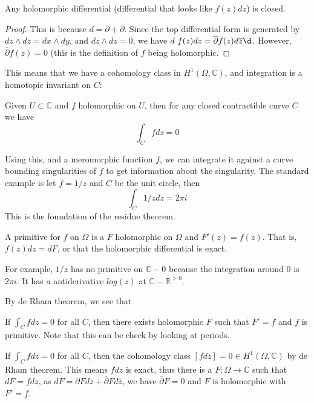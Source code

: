 \documentclass[main.tex]{subfiles}
\begin{document}
\begin{lemma}
Any holomorphic differential (differential that looks like $f(z) dz$) is closed. 
\end{lemma}

\begin{proof}
This is because $d = \partial + \overline{\partial}$. Since the top differential form is generated by $dz \wedge d\overline{z} = dx \wedge dy$, and $dz \wedge dz = 0$, we have $d \ f(z) dz = \overline{\partial} f(z) d\overline{z} \d$. However, $\overline{\partial} f(z) = 0$ (this is the definition of $f$ being holomorphic. 
\end{proof}

This means that we have a cohomology class in $H^1(\Omega, \mathbb{C})$, and integration is a homotopic invariant on $C$:

\begin{corollary}
Given $U \subset \mathbb{C}$ and $f$ holomorphic on $U$, then for any closed contractible curve $C$ we have 
$$
\int_C f dz = 0
$$
\end{corollary}

Using this, and a meromorphic function $f$, we can integrate it against a curve bounding singularities of $f$ to get information about the singularity. The standard example is let $f = 1/z$ and $C$ be the unit circle, then 
$$
\int_C 1/z dz = 2\pi i
$$
This is the foundation of the residue theorem. 

\begin{definition}

A primitive for $f$ on $\Omega$ is a $F$ holomorphic on $\Omega$ and $F'(z) = f(z)$. 
That is, $f(z) dz = dF$, or that the holomorphic differential is exact. 
\end{definition}

For example, $1/z$ has no primitive on $\mathbb{C}-0$ because the integration around $0$ is $2\pi i$. It has a antiderivative $log(z)$ at $\mathbb{C} - \mathbb{R}^{>0}$.



By de Rham theorem, we see that 
\begin{theorem}
If $\int_C f dz = 0$ for all $C$, then there exists holomorphic $F$ such that $F' = f$ and $f$ is primitive. Note that this can be check by looking at periods.
\end{theorem}

\begin{theorem}
If $\int_C f dz = 0$ for all $C$, then the cohomology class $[f dz] = 0 \in H^1(\Omega, \mathbb{C})$  by de Rham theorem. This means $f dz$ is exact, thus there is a $F: \Omega \rightarrow \mathbb{C}$ such that $dF = f dz$, as $dF = \partial F dz + \overline{\partial} F d\overline{z}$, we have $\overline{\partial} F = 0$ and $F$ is holomorphic with $F' = f$.
\end{theorem}
\end{document}
